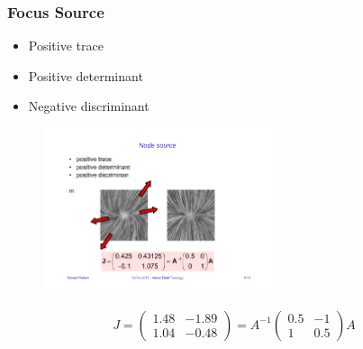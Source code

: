 \subsubsection{Focus Source}
\begin{itemize}
    \item Positive trace
    \item Positive determinant
    \item Negative discriminant
\end{itemize}
\begin{figure}[H]
    \centering
    \includegraphics[width=0.6\textwidth,page=4]{img/08_2d_critical_points}
\end{figure}
\begin{align*}
J = \begin{pmatrix}
     1.48 & -1.89\\
     1.04 & -0.48
 \end{pmatrix}
 = A ^{-1} 
     \begin{pmatrix}
         0.5 & -1\\
         1 & 0.5
     \end{pmatrix}A
\end{align*}

